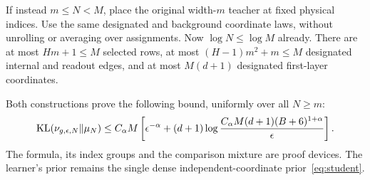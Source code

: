 If instead $m\le N<M$, place the original width-$m$ teacher at fixed physical indices. Use the same designated and background coordinate laws, without unrolling or averaging over assignments. Now $\log N\le\log M$ already. There are at most $Hm+1\le M$ selected rows, at most $(H-1)m^2+m\le M$ designated internal and readout edges, and at most $M(d+1)$ designated first-layer coordinates.

Both constructions prove the following bound, uniformly over all $N\ge m$:
\begin{equation}
 \operatorname{KL}(\nu_{g,\epsilon,N}\|\mu_N)
 \le C_\alpha M\left[
 \epsilon^{-\alpha}+(d+1)
 \log\frac{C_\alpha M(d+1)(B+6)^{1+\alpha}}\epsilon
 \right].
 \label{eq:embedding-kl}
\end{equation}
The formula, its index groups and the comparison mixture are proof devices. The learner's prior remains the single dense independent-coordinate prior~\eqref{eq:student}.
